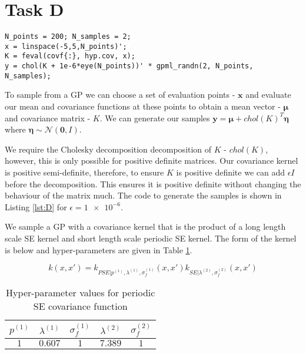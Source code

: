 \documentclass[11pt]{article}
\begin{document}
\section{Task D}

\begin{lstlisting}[caption=Code to generate samples from a GP with covariance given by covf, captionpos=b, basicstyle=\small, frame=tlrb]
N_points = 200; N_samples = 2;
x = linspace(-5,5,N_points)';
K = feval(covf{:}, hyp.cov, x);
y = chol(K + 1e-6*eye(N_points))' * gpml_randn(2, N_points, N_samples);
\end{lstlisting}
\label{lst:D}

To sample from a GP we can choose a set of evaluation points - $\textbf{x}$ and evaluate our mean and covariance functions at these points to obtain a mean vector - $\boldsymbol{\mu}$ and covariance matrix - $K$. We can generate our samples $\textbf{y} = \boldsymbol{\mu} + chol(K)^T \boldsymbol{\eta}$ where $\boldsymbol{\eta} \sim \mathcal{N}(\mathbf{0}, I)$.

We require the Cholesky decomposition decomposition of $K$ - $chol(K)$, however, this is only possible for positive definite matrices. Our covariance kernel is positive semi-definite, therefore, to ensure $K$ is positive definite we can add $\epsilon I$ before the decomposition. This ensures it is positive definite without changing the behaviour of the matrix much. The code to generate the samples is shown in Listing \ref{lst:D} for $\epsilon = \num{1e-6}$.

We sample a GP with a covariance kernel that is the product of a long length scale SE kernel and short length scale periodic SE kernel. The form of the kernel is below and hyper-parameters are given in Table \ref{table:D_product_covariance_hyper_parameters}.

\[k(x, x') = k_{PSE | p^{(1)}, \lambda^{(1)}, \sigma_f^{(1)}}(x, x')k_{SE | \lambda^{(2)}, \sigma_f^{(2)}}(x, x')\]

\begin{table}[h]
    \centering
    \small
    \begin{tabular}{|c|c|c|c|c|}
        \hline
        $p^{(1)}$ & $\lambda^{(1)}$ & $\sigma_f^{(1)}$ & $\lambda^{(2)}$ & $\sigma_f^{(2)}$ \\
        \hline
        $1$ & $0.607$ & $1$ & $7.389$ & $1$ \\
        \hline
    \end{tabular}
    \caption{Hyper-parameter values for periodic SE covariance function}
    \label{table:D_product_covariance_hyper_parameters}
\end{table}
\end{document}
